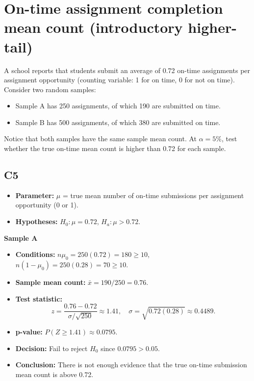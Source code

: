 \begin{center}
	\hspace{0.8cm}
	\hspace{0.8cm}
\end{center}
		
		
\section{On-time assignment completion mean count (introductory higher-tail)}
		A school reports that students submit an average of 0.72 on-time assignments per assignment opportunity (counting variable: 1 for on time, 0 for not on time). Consider two random samples:
		\begin{itemize}
		\item Sample A has 250 assignments, of which 190 are submitted on time.
		\item Sample B has 500 assignments, of which 380 are submitted on time.
		\end{itemize}
		Notice that both samples have the same sample mean count. At \(\alpha=5\%\), test whether the true on-time mean count is higher than 0.72 for each sample.
		
	\subsection*{C5}
	\begin{itemize}
	\item \textbf{Parameter:} \(\mu\) = true mean number of on-time submissions per assignment opportunity (0 or 1).
		\item \textbf{Hypotheses:} \(H_0\colon \mu=0.72\), \(H_a\colon \mu>0.72\).
	\end{itemize}
	
	\textbf{Sample A}
	
	\begin{itemize}
	\item \textbf{Conditions:} \(n\mu_0=250(0.72)=180\ge10\), \(n(1-\mu_0)=250(0.28)=70\ge10\).
	\item \textbf{Sample mean count:} \(\bar x=190/250=0.76\).
		\item \textbf{Test statistic:}
		\[
		z=\frac{0.76-0.72}{\sigma/\sqrt{250}}\approx 1.41,\quad \sigma=\sqrt{0.72(0.28)}\approx0.4489.
		\]
		\item \textbf{p-value:} \(P(Z\ge 1.41)\approx 0.0795\).
		\item \textbf{Decision:} Fail to reject \(H_0\) since \(0.0795>0.05\).
		\item \textbf{Conclusion:} There is not enough evidence that the true on-time submission mean count is above 0.72.
		\end{itemize}
		
